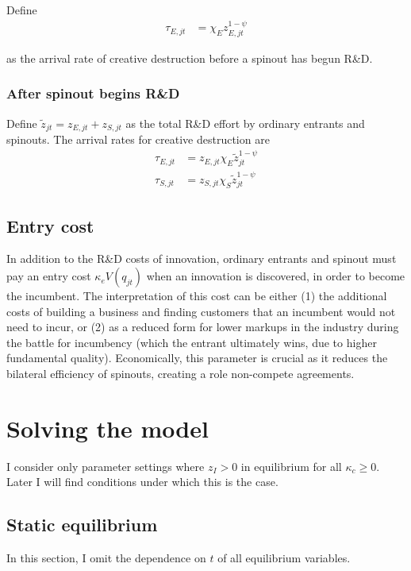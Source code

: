 \documentclass[12pt,english]{article}
\theoremstyle{remark}
\begin{document}
Define
\begin{align*}
	\tau_{E,jt} &= \chi_E z_{E,jt}^{1-\psi}
\end{align*}

as the arrival rate of creative destruction before a spinout has begun R\&D.

\subsubsection{After spinout begins R\&D}

Define $\tilde{z}_{jt} = z_{E,jt} + z_{S,jt}$ as the total R\&D effort by ordinary entrants and spinouts. The arrival rates for creative destruction are
\begin{align*}
	\tau_{E,jt} &= z_{E,jt} \chi_E \tilde{z}_{jt}^{1-\psi} \\
	\tau_{S,jt} &= z_{S,jt} \chi_S \tilde{z}_{jt}^{1-\psi}
\end{align*}

\subsection{Entry cost}

In addition to the R\&D costs of innovation, ordinary entrants and spinout must pay an entry cost $\kappa_{e} V(q_{jt})$ when an innovation is discovered, in order to become the incumbent. The interpretation of this cost can be either (1) the additional costs of building a business and finding customers that an incumbent would not need to incur, or (2) as a reduced form for lower markups in the industry during the battle for incumbency (which the entrant ultimately wins, due to higher fundamental quality). Economically, this parameter is crucial as it reduces the bilateral efficiency of spinouts, creating a role non-compete agreements. 


\section{Solving the model}

I consider only parameter settings where $z_I > 0$ in equilibrium for all $\kappa_c \ge 0$. Later I will find conditions under which this is the case.

\subsection{Static equilibrium}

In this section, I omit the dependence on $t$ of all equilibrium variables. 
\end{document}
